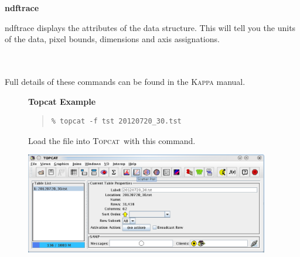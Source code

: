 \documentclass[twoside,11pt]{article}
\newcommand{\htmladdnormallink}[2]{#1}
\newenvironment{latexonly}{}{}
\newcommand{\xref}[3]{#1}
\renewcommand{\_}{\texttt{\symbol{95}}}
\newenvironment{fmpage}[1]{\begin{lrbox}{\fmbox}\begin{minipage}{#1}}{\end{minipage}\end{lrbox}\fbox{\usebox{\fmbox}}}
\newenvironment{myquote}{\begin{quote}\begin{small}}{\end{small}\end{quote}}
\newcommand{\topcat}{\htmladdnormallink{\textsc{Topcat}}{http://www.starlink.ac.uk/topcat}}
\newcommand{\task}[1]{\textsf{#1}}
\begin{document}
\begin{minipage}[t]{0.12\linewidth}
\textbf{ndftrace}
\end{minipage}
\begin{minipage}[t]{0.85\linewidth}
\task{ndftrace} displays the attributes of the data structure. This will tell
you the units of the data, pixel bounds, dimensions and axis assignations.\\
\end{minipage}
\\ \\
Full details of these commands can be found in the \xref{\textsc{Kappa} manual}{sun95}{}.

\begin{latexonly}
\begin{figure}[ht!]
\begin{center}
\begin{fmpage}{0.95\linewidth}
\vspace{0.2cm}
\textbf{ Topcat Example}

\vspace{0.5cm}

\begin{minipage}[c]{0.6\linewidth}

\begin{myquote}
\begin{verbatim}
% topcat -f tst 20120720_30.tst
\end{verbatim}
\end{myquote}
\end{minipage}
\hspace{0.3cm}
\begin{minipage}[c]{0.32\linewidth}
Load the file into \topcat\ with this command.
\end{minipage}

\vspace{0.5cm}

\begin{minipage}[c]{0.6\linewidth}
\centering
\includegraphics[width=0.95\textwidth]{sc21_topcat1.eps}


\end{minipage}
\end{fmpage}
\end{center}
\end{figure}
\end{latexonly}
\end{document}
